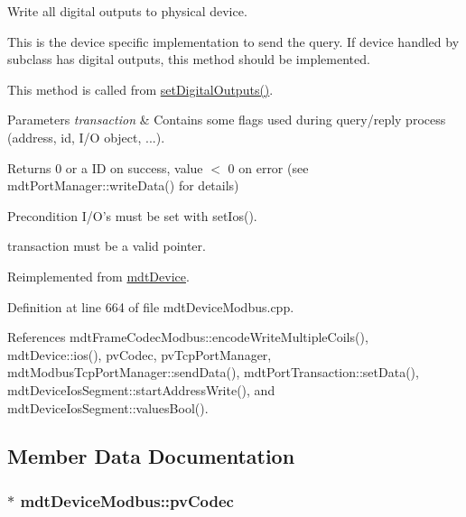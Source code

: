 Write all digital outputs to physical device. 

This is the device specific implementation to send the query. If device handled by subclass has digital outputs, this method should be implemented.

This method is called from \hyperlink{classmdt_device_a7b86a816e55a91f0d62426e1741437c6}{set\-Digital\-Outputs()}.


\begin{DoxyParams}{Parameters}
{\em transaction} & Contains some flags used during query/reply process (address, id, I/\-O object, ...). \\
\hline
\end{DoxyParams}
\begin{DoxyReturn}{Returns}
0 or a I\-D on success, value $<$ 0 on error (see mdt\-Port\-Manager\-::write\-Data() for details) 
\end{DoxyReturn}
\begin{DoxyPrecond}{Precondition}
I/\-O's must be set with set\-Ios(). 

transaction must be a valid pointer. 
\end{DoxyPrecond}


Reimplemented from \hyperlink{classmdt_device_ae644ab1ef0ebb57d6d9d502829907ec1}{mdt\-Device}.



Definition at line 664 of file mdt\-Device\-Modbus.\-cpp.



References mdt\-Frame\-Codec\-Modbus\-::encode\-Write\-Multiple\-Coils(), mdt\-Device\-::ios(), pv\-Codec, pv\-Tcp\-Port\-Manager, mdt\-Modbus\-Tcp\-Port\-Manager\-::send\-Data(), mdt\-Port\-Transaction\-::set\-Data(), mdt\-Device\-Ios\-Segment\-::start\-Address\-Write(), and mdt\-Device\-Ios\-Segment\-::values\-Bool().



\subsection{Member Data Documentation}
\hypertarget{classmdt_device_modbus_a2171d37ea720d546934f1c841e3c4d26}{
\subsubsection[{pv\-Codec}]{$\ast$ mdt\-Device\-Modbus\-::pv\-Codec\hspace{0.3cm}{\ttfamily [protected]}}}\label{classmdt_device_modbus_a2171d37ea720d546934f1c841e3c4d26}


